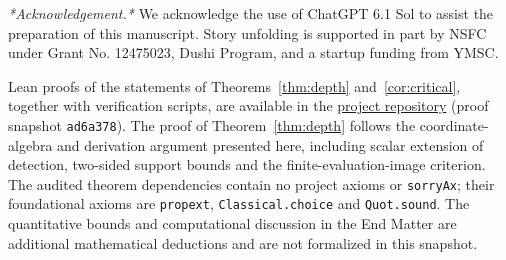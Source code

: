 \documentclass[aps,prl,reprint,notitlepage,nofootinbib,nobibnotes]{revtex4-2}
\begin{document}
\begin{acknowledgments}
\textit{*Acknowledgement.*} We acknowledge the use of ChatGPT 6.1 Sol to assist the preparation of this manuscript. Story unfolding is supported in part
by NSFC under Grant No. 12475023, Dushi Program, and a startup funding from YMSC.
\end{acknowledgments}

Lean proofs of the statements of Theorems~\ref{thm:depth}
and~\ref{cor:critical}, together with verification scripts, are available
in the \href{https://github.com/Imine20/critical-depth-for-the-infinite-logical-set/tree/ad6a378f6080ba32d92e7c31b6cf71b07685970a}{project repository}
(proof snapshot \texttt{ad6a378}). The proof of
Theorem~\ref{thm:depth} follows the coordinate-algebra and derivation
argument presented here, including scalar extension of detection,
two-sided support bounds and the finite-evaluation-image criterion.
The audited theorem dependencies contain no project axioms or
\texttt{sorryAx}; their foundational axioms are
\texttt{propext}, \texttt{Classical.choice} and \texttt{Quot.sound}.
The quantitative bounds and computational discussion in the End Matter
are additional mathematical deductions and are not formalized in this
snapshot.
\end{document}
